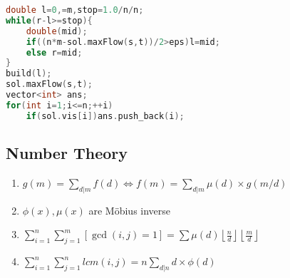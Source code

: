 \begin{enumerate}
\begin{enumerate}
	\end{enumerate}
\end{enumerate}
\begin{lstlisting}[language=C++]
double l=0,=m,stop=1.0/n/n;
while(r-l>=stop){
	double(mid);
	if((n*m-sol.maxFlow(s,t))/2>eps)l=mid;
	else r=mid;
}
build(l);
sol.maxFlow(s,t);
vector<int> ans;
for(int i=1;i<=n;++i)
	if(sol.vis[i])ans.push_back(i);
\end{lstlisting}



\subsection{Number Theory}
\begin{enumerate}\itemsep = -3pt
  \item $g(m)=\sum_{d|m}f(d)\Leftrightarrow f(m)=\sum_{d|m}\mu (d) \times g(m/d)$
  \item $\phi(x), \mu(x)$ are Möbius inverse
  \item $\sum_{i=1}^n\sum_{j=1}^m [\gcd(i, j) = 1]=\sum \mu(d)\left \lfloor \frac{n}{d} \right \rfloor \left \lfloor \frac{m}{d} \right \rfloor$
  \item $\sum_{i=1}^n\sum_{j=1}^nlcm(i,j)=n\sum_{d|n} d \times \phi (d)$
\end{enumerate}


